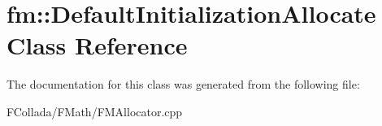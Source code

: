 \hypertarget{classfm_1_1DefaultInitializationAllocate}{
\section{fm::DefaultInitializationAllocate Class Reference}
\label{classfm_1_1DefaultInitializationAllocate}
}


The documentation for this class was generated from the following file:\begin{DoxyCompactItemize}
\item 
FCollada/FMath/FMAllocator.cpp\end{DoxyCompactItemize}
